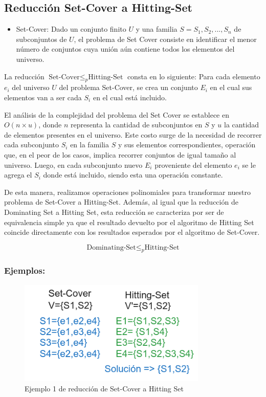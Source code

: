 \subsection{Reducción Set-Cover a Hitting-Set}

\begin{itemize}
    \item Set-Cover: Dado un conjunto finito $U$ y una familia $S= {S_1, S_2, ..., S_n}$ de subconjuntos de $U$, el problema de Set Cover consiste en identificar el menor número de conjuntos cuya unión aún contiene todos los elementos del universo. 
\end{itemize}

La reducción $\text{Set-Cover} \leq_{p} \text{Hitting-Set}$ consta en lo siguiente:
Para cada elemento $e_i$ del universo $U$ del problema Set-Cover, se crea un conjunto $E_{i}$ en el cual sus elementos van a ser cada $S_i$ en el cual está incluido.

El análisis de la complejidad del problema del Set Cover se establece en $O(n\times u)$, donde $n$ representa la cantidad de subconjuntos en $S$ y $u$ la cantidad de elementos presentes en el universo. Este costo surge de la necesidad de recorrer cada subconjunto $S_i$ en la familia $S$ y sus elementos correspondientes, operación que, en el peor de los casos, implica recorrer conjuntos de igual tamaño al universo. Luego, en cada subconjunto nuevo $E_i$ proveniente del elemento $e_i$ se le agrega el $S_i$ donde está incluido, siendo esta una operación constante. 

De esta manera, realizamos operaciones polinomiales para transformar nuestro problema de Set-Cover a Hitting-Set. Además, al igual que la reducción de Dominating Set a Hitting Set, esta reducción se caracteriza por ser de equivalencia simple ya que el resultado devuelto por el algoritmo de Hitting Set coincide directamente con los resultados esperados por el algoritmo de Set-Cover.


\[\text{Dominating-Set}  \leq _{p} \text{Hitting-Set}\]

\subsubsection{Ejemplos:} 

\begin{figure}[H]
    \centering
    \includegraphics[width=0.8\textwidth]{img/ejemplo1_SC-HS.png}
    \caption{Ejemplo 1 de reducción de Set-Cover a Hitting Set}
    \label{fig:ejemplo1_DS-HS}
\end{figure}

